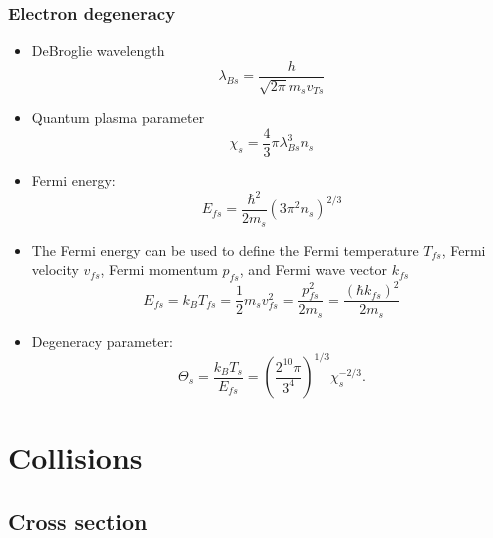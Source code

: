 \documentclass[a4paper,11pt]{report}
\begin{document}
\subsection{Electron degeneracy}

\begin{itemize}
    \item DeBroglie wavelength
    \begin{equation}
        \lambda_{Bs} = \dfrac{h}{\sqrt{2 \pi} m_s v_{Ts}}
    \end{equation}
    \item Quantum plasma parameter
    \begin{equation}
        \chi_s = \frac{4}{3} \pi \lambda_{Bs}^3 n_s
    \end{equation}
    
    \item Fermi energy:
    \begin{equation}
        E_{fs} = \frac{\hbar^2}{2m_s} \left ( 3 \pi^2 n_s \right)^{2/3}
    \end{equation}

    \item The Fermi energy can be used to define the Fermi temperature $T_{fs}$, Fermi velocity $v_{fs}$, Fermi momentum $p_{fs}$, and Fermi wave vector $k_{fs}$
    \begin{equation}
        E_{fs} = k_B T_{fs} = \frac{1}{2} m_s v_{fs}^2  = \frac{p_{fs}^2}{2m_s} = \frac{\left ( \hbar k_{fs} \right ) ^2}{2m_s}
    \end{equation}

    \item Degeneracy parameter:
    \begin{equation}
        \Theta_s = \frac{k_B T_s}{E_{fs}} = \left( \frac{2^{10} \pi}{3^4} \right)^{1/3} \chi_s^{-2/3}.
    \end{equation}
\end{itemize}

\chapter{Collisions}
\section{Cross section}
\end{document}
